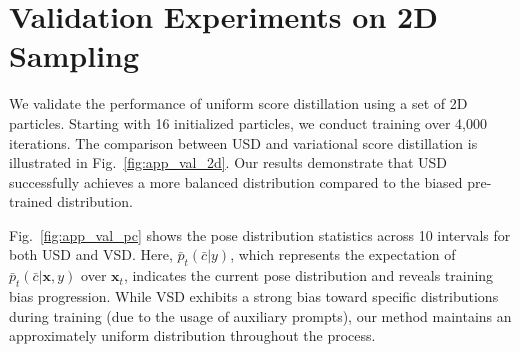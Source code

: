\section{Validation Experiments on 2D Sampling}\label{app:val_exps}





We validate the performance of uniform score distillation using a set of 2D particles. Starting with 16 initialized particles, we conduct training over 4,000 iterations. The comparison between USD and variational score distillation is illustrated in Fig.~\ref{fig:app_val_2d}. Our results demonstrate that USD successfully achieves a more balanced distribution compared to the biased pre-trained distribution.




Fig.~\ref{fig:app_val_pc} shows the pose distribution statistics across 10 intervals for both USD and VSD. Here, $\bar{p}_t(\bar{c}|y)$, which represents the expectation of $\bar{p}_t(\bar{c}|\boldsymbol{x},y)$ over $\boldsymbol{x}_t$, indicates the current pose distribution and reveals training bias progression. While VSD exhibits a strong bias toward specific distributions during training (due to the usage of auxiliary prompts), our method maintains an approximately uniform distribution throughout the process.


